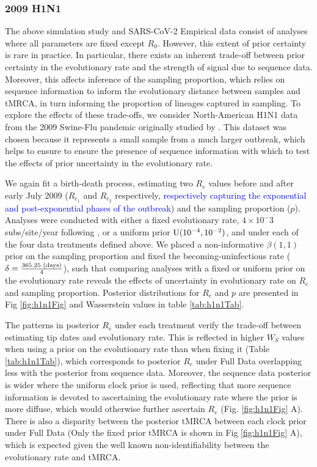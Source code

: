 \documentclass{article}
\begin{document}
\subsubsection*{2009 H1N1}
The above simulation study and SARS-CoV-2 Empirical data consist of analyses where all parameters are fixed except $R_0$. However, this extent of prior certainty is rare in practice. In particular, there exists an inherent trade-off between prior certainty in the evolutionary rate and the strength of signal due to sequence data. Moreover, this affects inference of the sampling proportion, which relies on sequence information to inform the evolutionary distance between samples and tMRCA, in turn informing the proportion of lineages captured in sampling. To explore the effects of these trade-offs, we consider North-American H1N1 data from the 2009 Swine-Flu pandemic originally studied by \citet{hedge_2013_real-time}. This dataset was chosen because it represents a small sample from a much larger outbreak, which helps to ensure to ensure the presence of sequence information with which to test the effects of prior uncertainty in the evolutionary rate.

We again fit a birth-death process, estimating two $R_e$ values before and after early July 2009 ($R_{e_1}$ and $R_{e_2}$ respectively, \textcolor{blue}{respectively capturing the exponential and post-exponential phases of the outbreak}) and the sampling proportion ($p$). Analyses were conducted with either a fixed evolutionary rate, $4\times10^-3$ subs/site/year following \citet{hedge_2013_real-time}, or a uniform prior $\textnormal{U}(10^{-4}, 10^{-2})$, and under each of the four data treatments defined above. We placed a non-informative $\beta(1,1)$ prior on the sampling proportion and fixed the becoming-uninfectious rate ($\delta=\frac{365.25\textnormal{ (days)}}{4}$), such that comparing analyses with a fixed or uniform prior on the evolutionary rate reveals the effects of uncertainty in evolutionary rate on $R_e$ and sampling proportion. Posterior distributions for $R_e$ and $p$ are presented in Fig \ref{fig:h1n1Fig} and Wasserstein values in table \ref{tab:h1n1Tab}.

The patterns in posterior $R_e$ under each treatment verify the trade-off between estimating tip dates and evolutionary rate. This is reflected in higher $W_S$ values when using a prior on the evolutionary rate than when fixing it (Table \ref{tab:h1n1Tab}), which corresponds to posterior $R_e$ under Full Data overlapping less with the posterior from sequence data. Moreover, the sequence data posterior is wider where the uniform clock prior is used, reflecting that more sequence information is devoted to ascertaining the evolutionary rate where the prior is more diffuse, which would otherwise further ascertain $R_e$ (Fig. \ref{fig:h1n1Fig} A). There is also a disparity between the posterior tMRCA between each clock prior under Full Data (Only the fixed prior tMRCA is shown in Fig \ref{fig:h1n1Fig} A), which is expected given the well known non-identifiability between the evolutionary rate and tMRCA. 
\end{document}

